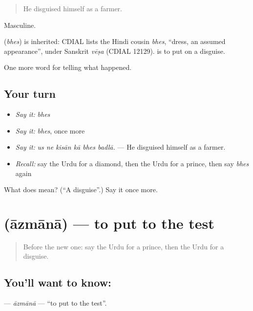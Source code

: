 \begin{quote}
He disguised himself as a farmer.
\end{quote}

Masculine.

\begin{cousinweb}
\textbf{} (\emph{bhes}) is inherited: CDIAL lists the Hindi cousin \emph{bhes}, \textquotedblleft{}dress, an assumed appearance\textquotedblright{}, under Sanskrit \emph{vēṣa} (CDIAL 12129). \textbf{ } is to put on a disguise.
\end{cousinweb}

\begin{grammarlens}[title={What you've built}]
One more word for telling what happened.
\end{grammarlens}

\subsection*{Your turn}
\begin{itemize}
\raggedright
  \item \emph{Say it:} \emph{bhes}
  \item \emph{Say it:} \emph{bhes}, once more
  \item \emph{Say it:} \emph{us ne kisān kā bhes badlā.} — He disguised himself as a farmer.
  \item \emph{Recall:} say the Urdu for a diamond, then the Urdu for a prince, then say \emph{bhes} again
\end{itemize}

\begin{tcolorbox}[breakable,colback=teal!4,colframe=teal!35!black,title={Before you move on}]
What does  mean? (\textquotedblleft{}A disguise\textquotedblright{}.) Say it once more.
\end{tcolorbox}
\section[\texorpdfstring{\ur{آزمانا} (āzmānā)}{آزمانا (āzmānā)}]{ (āzmānā) — to put to the test}

\label{lesson:UR-C328-azmana}



\begin{quote}
Before the new one: say the Urdu for a prince, then the Urdu for a disguise.
\end{quote}

\subsection*{You'll want to know: }
\textbf{} — \emph{āzmānā} — \textquotedblleft{}to put to the test\textquotedblright{}.

